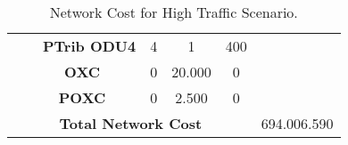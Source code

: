 \begin{table}[H]
\begin{tabular}{|c|c|c|c|c|c|c|}
                                    &                               & \textbf{PTrib ODU4} & 4                 & 1                   & 400           &                              \\ \cline{2-6}
                                    & \multicolumn{2}{c|}{\textbf{OXC}}                   & 0                 & 20.000              & 0             &                              \\ \cline{2-6}
                                    & \multicolumn{2}{c|}{\textbf{POXC}}                  & 0                 & 2.500               & 0             &                              \\ \hline
\multicolumn{6}{|c|}{\textbf{Total Network Cost}}                                                                                                   & 694.006.590                  \\ \hline
\end{tabular}
\caption{Network Cost for High Traffic Scenario.}
\end{table}